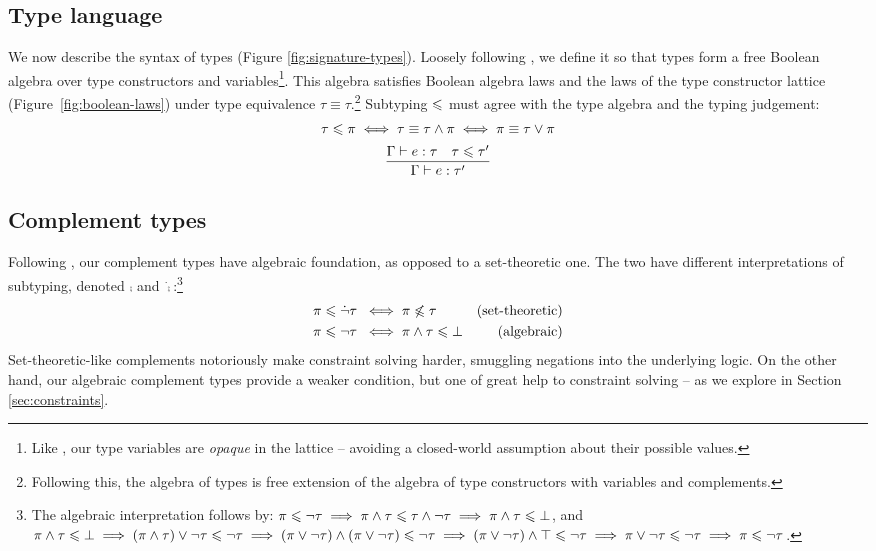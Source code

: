 \subsection{Type language}

We now describe the syntax of types (Figure \ref{fig:signature-types}). Loosely following \textcite{mlstruct}, we define it so that types form a free Boolean algebra over type constructors and variables\footnote{Like \textcite{dolan-thesis}, our type variables are \emph{opaque} in the lattice -- avoiding a closed-world assumption about their possible values.}. This algebra satisfies Boolean algebra laws and the laws of the type constructor lattice (Figure~\ref{fig:boolean-laws}) under type equivalence $\tau \equiv \tau$.\footnote{Following this, the algebra of types is free extension of the algebra of type constructors with variables and complements.} Subtyping $\leqslant$ must agree with the type algebra and the typing judgement:
$$ \begin{array}{c}
   \tau \leqslant \pi \iff \tau \equiv \tau \land \pi \iff \pi \equiv \tau \lor \pi \\[5pt]
   \dfrac{\Gamma \vdash e : \tau \quad \tau \leqslant \tau'}{\Gamma \vdash e : \tau'}
\end{array} $$

\subsection{Complement types} 
\label{subsec:oh-god-complements}
Following \textcite{mlstruct}, our complement types have algebraic foundation, as opposed to a set-theoretic one. The two have different interpretations of subtyping, denoted $\comp$ and $\dot \comp$:\footnote{The algebraic interpretation follows by: $\pi \leqslant \lnot \tau \implies \pi \land \tau \leqslant \tau \land \lnot \tau \implies \pi \land \tau \leqslant \bot$, and $\pi \land \tau \leqslant \bot \implies (\pi \land \tau) \lor \lnot \tau \leqslant \lnot \tau \implies (\pi \lor \lnot \tau) \land (\pi \lor \lnot \tau) \leqslant \lnot \tau \implies (\pi \lor \lnot \tau) \land \top \leqslant \lnot \tau \implies \pi \lor \lnot \tau \leqslant \lnot \tau \implies \pi \leqslant \lnot \tau$.}
\begin{align*}
    \pi \leqslant \dot {\lnot} \tau \;&\iff \pi \not\leqslant \tau & \text{(set-theoretic)} \\
    \pi \leqslant \lnot \tau \;&\iff \pi \land \tau \leqslant \bot & \text{(algebraic)} 
\end{align*}
Set-theoretic-like complements notoriously make constraint solving harder, smuggling negations into the underlying logic. On the other hand, our algebraic complement types provide a weaker condition, but one of great help to constraint solving -- as we explore in Section \ref{sec:constraints}.

